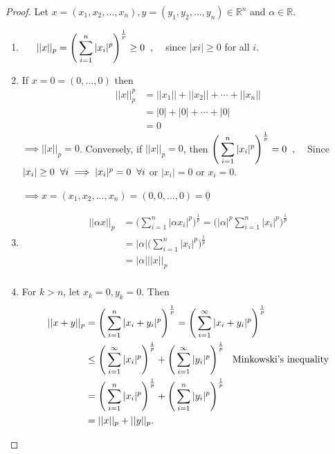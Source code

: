 \documentclass[11pt,a4paper]{article}
\theoremstyle{definition}
\begin{document}
\begin{proof}
Let $x=(x_1,x_2,\dots,x_n), y=(y_1,y_2,\dots,y_n)\in \mathbb{R}^n$ and $\alpha \in \mathbb{R}$.
\begin{enumerate}
\item[i] $\hspace{0.5cm}\displaystyle{||x||_p=\Bigg(\sum^n_{i=1}|x_i|^p\Bigg)^{\frac{1}{p}}\geq 0}\hspace{0.2cm},\hspace{0.3cm}$ since $|xi|\geq 0$ for all $i$.
\item[ii] \hspace{0.3cm} If $x=0=(0,\dots,0)$ then
\begin{align*}
||x||^p_p  &=||x_1||+||x_2||+\cdots+||x_n||\\
           &=|0|+|0|+\cdots+|0|\\
           &=0
\end{align*}
$\implies ||x||_p=0$.
Conversely, if $||x||_p=0$, then \hspace{0.2cm}$\displaystyle{\Bigg(\sum^n_{i=1}|x_i|^p\Bigg)^{\frac{1}{p}}=0}\hspace{0.2cm},\hspace{0.3cm}$ Since $|x_i|\geq 0\hspace{0.2cm} \forall i\implies |x_i|^p=0\hspace{0.2cm} \forall i$ or $|x_i|=0$ or $x_i=0$.

$\implies x=(x_1,x_2,\dots,x_n)=(0,0,\dots,0)=\underline{0}$

\item[iii]
\begin{align*}
||\alpha x||_p &=\Bigg(\sum^n_{i=1}|\alpha x_i|^p\Bigg)^{\frac{1}{p}}
               =\Bigg(|\alpha|^p\sum^n_{i=1}|x_i|^p\Bigg)^{\frac{1}{p}}\\
               &=|\alpha|\Bigg(\sum^n_{i=1}|x_i|^p\Bigg)^{\frac{1}{p}}\\
               &=|\alpha|||x||_p\\
\end{align*}
\item[iv] For $k>n$, let $x_k=0,y_k=0$. Then
\begin{align*}
||x+y||_p &=\Bigg(\sum^n_{i=1}|x_i+y_i|^p\Bigg)^{\frac{1}{p}}
          =\Bigg(\sum^{\infty}_{i=1}|x_i+y_i|^p\Bigg)^{\frac{1}{p}}\\
          &\leq \Bigg(\sum^{\infty}_{i=1}|x_i|^p\Bigg)^{\frac{1}{p}}+\Bigg(\sum^{\infty}_{i=1}|y_i|^p\Bigg)^{\frac{1}{p}}\hspace{0.3cm}\text{Minkowski's inequality}\\
          &=\Bigg(\sum^n_{i=1}|x_i|^p\Bigg)^{\frac{1}{p}}+\Bigg(\sum^n_{i=1}|y_i|^p\Bigg)^{\frac{1}{p}}\\
          &=||x||_p+||y||_p.\\
\end{align*}
\end{enumerate}
\end{proof}
\end{document}
